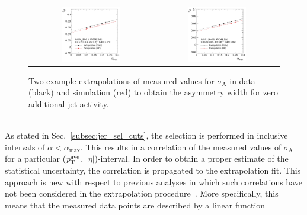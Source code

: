 \begin{figure}[!tp]
  \centering
  \begin{tabular}{cc}
                \includegraphics[width=0.49\textwidth]{figures/Extrapol_Eta0_pt4_final_nominal_v4.pdf} &
                \includegraphics[width=0.49\textwidth]{figures/Extrapol_Eta0_pt9_final_nominal_v4.pdf}
  \end{tabular}
  \caption{Two example extrapolations of measured values for $\sigma_\mathrm{A}$ in data (black) and simulation (red) to obtain the asymmetry width for zero additional jet activity.}
  \label{fig:extrapol}
\end{figure}
\\
As stated in Sec.~\ref{subsec:jer_sel_cuts}, the selection is performed in inclusive intervals of $\alpha < \alpha_\mathrm{max}$. This results in a correlation of the measured values of $\sigma_\mathrm{A}$ for a particular ($p_{\text{T}}^\mathrm{ave}$, $|\eta|$)-interval. In order to obtain a proper estimate of the statistical uncertainty, the correlation is propagated to the extrapolation fit. This approach is new with respect to previous analyses in which such correlations have not been considered in the extrapolation procedure~\cite{1748-0221-6-11-P11002, thesis:Schroeder, Aad:2012ag}. More specifically, this means that the measured data points are described by a linear function 
